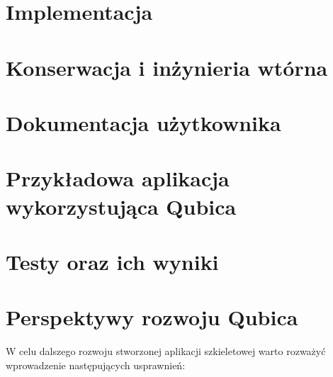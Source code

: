 \documentclass[12pt]{report}
\begin{document}
\section{Implementacja} %

\section{Konserwacja i inżynieria wtórna} %

\section{Dokumentacja użytkownika}

\section{Przykładowa aplikacja wykorzystująca Qubica}

\section{Testy oraz ich wyniki}

\section{Perspektywy rozwoju Qubica}

W celu dalszego rozwoju stworzonej aplikacji szkieletowej warto rozważyć wprowadzenie następujących usprawnień:
\end{document}
